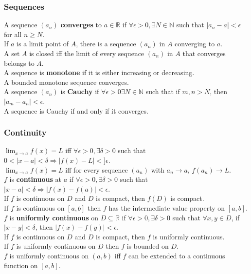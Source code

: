 \documentclass[letterpaper,8pt,landscape]{article}
\newcommand{\R}{\mathbb{R}}
\newcommand{\N}{\mathbb{N}}
\begin{document}
\begin{multicols}{2}
\subsubsection*{Sequences}
A sequence $(a_n)$ {\bf converges} to $a\in\R$ if $\forall \epsilon>0, \exists N\in \N$ such that $|a_n-a|<\epsilon$ for all $n\geq N$.\\
If $a$ is a limit point of $A$, there is a sequence $(a_n)$ in $A$ converging to $a$.\\
A set $A$ is closed iff the limit of every sequence $(a_n)$ in $A$ that converges belongs to $A$.\\
A sequence is {\bf monotone} if it is either increasing or decreasing.\\
A bounded monotone sequence converges.\\
A sequence $(a_n)$ is {\bf Cauchy} if $\forall \epsilon>0 \exists N\in\N$ such that if $m,n>N$, then $|a_m-a_n|<\epsilon$.\\
A sequence is Cauchy if and only if it converges.

\subsubsection*{Continuity}
$\lim_{x\to a}f(x) = L$ iff $\forall \epsilon>0, \exists \delta>0$ such that $0<|x-a|<\delta \Rightarrow |f(x)-L|<]\epsilon$.\\
$\lim_{x\to a}f(x) = L$ iff for every sequence $(a_n)$ with $a_n\to a$, $f(a_n)\to L$.\\
$f$ is {\bf continuous} at $a$ if $\forall \epsilon>0, \exists \delta>0$ such that $|x-a|<\delta \Rightarrow |f(x)-f(a)|<\epsilon$.\\
If $f$ is continuous on $D$ and $D$ is compact, then $f(D)$ is compact.\\
If $f$ is continuous on $[a,b]$ then $f$ has the intermediate value property on $[a,b]$.\\
$f$ is {\bf uniformly continuous} on $D\subseteq \R$ if $\forall \epsilon>0, \exists \delta>0$ such that $\forall x,y\in D$, if $|x-y|<\delta$, then $|f(x)-f(y)|<\epsilon$.\\
If $f$ is continuous on $D$ and $D$ is compact, then $f$ is uniformly continuous.\\
If $f$ is uniformly continuous on $D$ then $f$ is bounded on $D$.\\
$f$ is uniformly continuous on $(a,b)$ iff $f$ can be extended to a continuous function on $[a,b]$.


\end{multicols}
\end{document}
